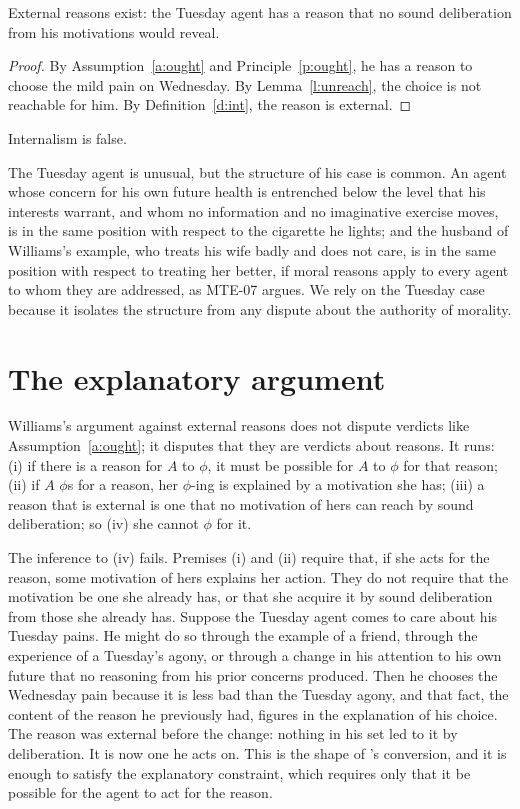 \documentclass{situationist-preprint}
\begin{document}
\begin{theorem}\label{t:main}
External reasons exist: the Tuesday agent has a reason that no sound deliberation from his motivations would reveal.
\end{theorem}

\begin{proof}
By Assumption~\ref{a:ought} and Principle~\ref{p:ought}, he has a reason to choose the mild pain on Wednesday. By Lemma~\ref{l:unreach}, the choice is not reachable for him. By Definition~\ref{d:int}, the reason is external.
\end{proof}

\begin{corollary}\label{c:int}
Internalism is false.
\end{corollary}

The Tuesday agent is unusual, but the structure of his case is common. An agent whose concern for his own future health is entrenched below the level that his interests warrant, and whom no information and no imaginative exercise moves, is in the same position with respect to the cigarette he lights; and the husband of Williams's example, who treats his wife badly and does not care, is in the same position with respect to treating her better, if moral reasons apply to every agent to whom they are addressed, as MTE-07 argues. We rely on the Tuesday case because it isolates the structure from any dispute about the authority of morality.

\section{The explanatory argument}\label{s:expl}

Williams's argument against external reasons does not dispute verdicts like Assumption~\ref{a:ought}; it disputes that they are verdicts about reasons. It runs: (i) if there is a reason for $A$ to $\phi$, it must be possible for $A$ to $\phi$ for that reason; (ii) if $A$ $\phi$s for a reason, her $\phi$-ing is explained by a motivation she has; (iii) a reason that is external is one that no motivation of hers can reach by sound deliberation; so (iv) she cannot $\phi$ for it.

The inference to (iv) fails. Premises (i) and (ii) require that, if she acts for the reason, some motivation of hers explains her action. They do not require that the motivation be one she already has, or that she acquire it by sound deliberation from those she already has. Suppose the Tuesday agent comes to care about his Tuesday pains. He might do so through the example of a friend, through the experience of a Tuesday's agony, or through a change in his attention to his own future that no reasoning from his prior concerns produced. Then he chooses the Wednesday pain because it is less bad than the Tuesday agony, and that fact, the content of the reason he previously had, figures in the explanation of his choice. The reason was external before the change: nothing in his set led to it by deliberation. It is now one he acts on. This is the shape of \citet{McDowell1995}'s conversion, and it is enough to satisfy the explanatory constraint, which requires only that it be possible for the agent to act for the reason.
\end{document}
